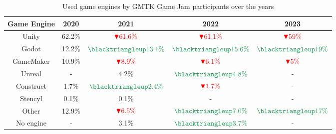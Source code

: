 \begin{table}[ht!]
    \centering
    \begin{tabular}{|c c c c c|}
        \hline
        Game Engine & 2020   & 2021                                               & 2022                                               & 2023                                             \\
        \hline\hline
        Unity       & 62.2\% & $\textcolor{red}{\blacktriangledown 61.6\%}$       & $\textcolor{red}{\blacktriangledown 61.1\%}$       & $\textcolor{red}{\blacktriangledown 59\%}$       \\
        Godot       & 12.2\% & $\textcolor{ForestGreen}{\blacktriangleup 13.1\%}$ & $\textcolor{ForestGreen}{\blacktriangleup 15.6\%}$ & $\textcolor{ForestGreen}{\blacktriangleup 19\%}$ \\
        GameMaker   & 10.9\% & $\textcolor{red}{\blacktriangledown 8.9\% }$       & $\textcolor{red}{\blacktriangledown 6.1\%}$        & $\textcolor{red}{\blacktriangledown 5\%}$        \\
        Unreal      & -      & 4.2\%                                              & $\textcolor{ForestGreen}{\blacktriangleup 4.8\%}$  & -                                                \\
        Construct   & 1.7\%  & $\textcolor{ForestGreen}{\blacktriangleup 2.4\%}$  & $\textcolor{red}{\blacktriangledown 1.7\%}$        & -                                                \\
        Stencyl     & 0.1\%  & 0.1\%                                              & -                                                  & -                                                \\
        Other       & 12.9\% & $\textcolor{red}{\blacktriangledown 6.5\%}$        & $\textcolor{ForestGreen}{\blacktriangleup 7.0\%}$  & $\textcolor{ForestGreen}{\blacktriangleup 17\%}$ \\
        No engine   & -      & 3.1\%                                              & $\textcolor{ForestGreen}{\blacktriangleup 3.7\%}$  & -                                                \\
        \hline
    \end{tabular}
    \caption{Used game engines by GMTK Game Jam participants over the years \cite{gmtk-twitter}}
    \label{table:gmtk}
\end{table}

